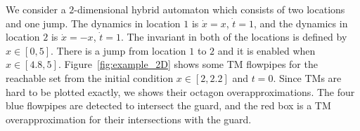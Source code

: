 \begin{example}
 We consider a $2$-dimensional hybrid automaton which consists of two locations and one jump. The dynamics in location $1$ is $\dot{x} = x$, $\dot{t} = 1$, and the dynamics in location $2$ is $\dot{x} = -x$, $\dot{t} = 1$. The invariant in both of the locations is defined by $x\in [0,5]$. There is a jump from location $1$ to $2$ and it is enabled when $x \in [4.8,5]$. Figure~\ref{fig:example_2D} shows some TM flowpipes for the reachable set from the initial condition $x\in [2,2.2]$ and $t = 0$. Since TMs are hard to be plotted exactly, we shows their octagon overapproximations. The four blue flowpipes are detected to intersect the guard, and the red box is a TM overapproximation for their intersections with the guard.
\end{example}









